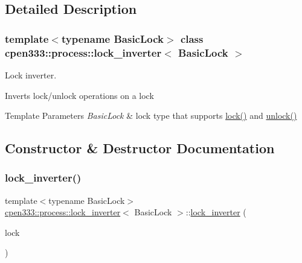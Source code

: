 \subsection{Detailed Description}
\subsubsection*{template$<$typename Basic\+Lock$>$\newline
class cpen333\+::process\+::lock\+\_\+inverter$<$ Basic\+Lock $>$}

Lock inverter. 

Inverts lock/unlock operations on a lock


\begin{DoxyTemplParams}{Template Parameters}
{\em Basic\+Lock} & lock type that supports \hyperlink{classcpen333_1_1process_1_1lock__inverter_a7281b963f45b2c3b511981c18123a66b}{lock()} and \hyperlink{classcpen333_1_1process_1_1lock__inverter_ad8fb72f68de7a1082d1169e02937d9c9}{unlock()} \\
\hline
\end{DoxyTemplParams}


\subsection{Constructor \& Destructor Documentation}
\mbox{\label{classcpen333_1_1process_1_1lock__inverter_a5d794669d828d4c4dcc6a06dbc10f3f0}} 
\subsubsection{\texorpdfstring{lock\+\_\+inverter()}{lock\_inverter()}}
{\footnotesize\ttfamily template$<$typename Basic\+Lock$>$ \\
\hyperlink{classcpen333_1_1process_1_1lock__inverter}{cpen333\+::process\+::lock\+\_\+inverter}$<$ Basic\+Lock $>$\+::\hyperlink{classcpen333_1_1process_1_1lock__inverter}{lock\+\_\+inverter} (\begin{DoxyParamCaption}\item[{Basic\+Lock \&}]{lock }\end{DoxyParamCaption})\hspace{0.3cm}{\ttfamily [inline]}}



